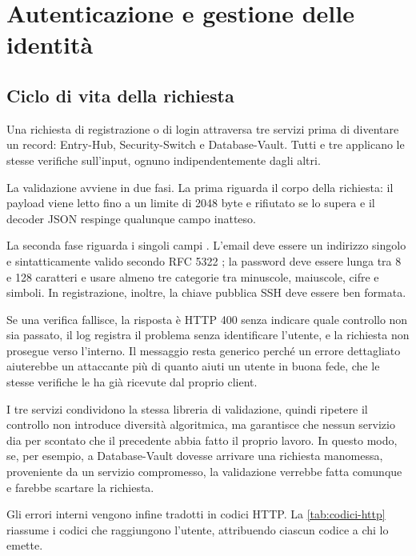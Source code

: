 \chapter{Autenticazione e gestione delle identità}
\label{chap:autenticazione}

\section{Ciclo di vita della richiesta}
\label{sec:ciclo-richiesta}

Una richiesta di registrazione o di login attraversa tre servizi prima di diventare un record:
Entry-Hub, Security-Switch e Database-Vault. Tutti e tre applicano le stesse verifiche sull'input,
ognuno indipendentemente dagli altri.

La validazione avviene in due fasi. La prima riguarda il corpo della richiesta: il payload viene
letto fino a un limite di 2048 byte e rifiutato se lo supera e il decoder JSON respinge qualunque campo inatteso.

La seconda fase riguarda i singoli campi \cite{ramusb-code-eh-f-04}. L'email deve essere un
indirizzo singolo e sintatticamente valido secondo RFC 5322 \cite{rfc5322}; la password deve essere
lunga tra 8 e 128 caratteri e usare almeno tre categorie tra minuscole, maiuscole, cifre e simboli.
In registrazione, inoltre, la chiave pubblica SSH deve essere ben formata.

Se una verifica fallisce, la risposta è HTTP 400 senza indicare quale controllo non sia passato, il
log registra il problema senza identificare l'utente, e la richiesta non prosegue verso l'interno. 
Il messaggio resta generico perché un errore dettagliato aiuterebbe un attaccante più di quanto aiuti un
utente in buona fede, che le stesse verifiche le ha già ricevute dal proprio client.

I tre servizi condividono la stessa libreria di validazione, quindi ripetere il controllo non
introduce diversità algoritmica, ma garantisce che nessun servizio dia per scontato che il
precedente abbia fatto il proprio lavoro. In questo modo, se, per esempio, a Database-Vault dovesse arrivare una
richiesta manomessa, proveniente da un servizio compromesso, la validazione verrebbe fatta comunque e farebbe scartare la richiesta.

Gli errori interni vengono infine tradotti in codici HTTP. La \autoref{tab:codici-http} riassume i codici 
che raggiungono l'utente, attribuendo ciascun codice a chi lo emette.


